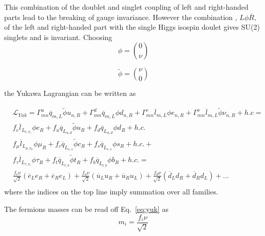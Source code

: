 This combination of the doublet and singlet coupling of left and right-handed parts lead to the breaking of gauge invariance. However the combination , $L\phi\overline{R}$, of the left and right-handed part with the single Higgs isospin doulet gives SU(2) singlets and is invariant. Choosing
\begin{equation}
  \phi = \binom{0}{\nu} %
\end{equation}

\begin{equation}
  \tilde{\phi} = \binom{\nu}{0}
\end{equation}


the Yukawa Lagrangian can be written as %

\begin{equation}
\begin{split}
    &\mathcal{L}_{Yuk} = \Gamma_{mn}^{u}\overline{q}_{m,L}\tilde{\phi}u_{n,R} + \Gamma_{mn}^{d}\overline{q}_{m,L}\phi d_{n,R} + \Gamma_{mn}^{e}\overline{l}_{m,L}\phi e_{n,R} + \Gamma_{mn}^{\nu}\overline{l}_{m,L}\tilde{\phi}\nu_{n,R} +h.c = \\
 &f_{e}\overline{l}_{L_{e,\nu_{e}}}\phi e_{R} + f_{u}\overline{q}_{L_{u,d}}\tilde{\phi}u_{R} + f_{d}\overline{q}_{L_{u,d}}\phi d_{R} + h.c. \\
 & f_{\mu}\overline{l}_{L_{\mu,\nu_{\mu}}}\phi \mu_{R} + f_{c}\overline{q}_{L_{c,s}}\tilde{\phi}c_{R} + f_{s}\overline{q}_{L_{c,s}}\phi s_{R} + h.c. +\\
    & f_{\tau}\overline{l}_{L_{\tau,\nu_{\tau}}}\phi \tau_{R} + f_{t}\overline{q}_{L_{t,b}}\tilde{\phi}t_{R} + f_{b}\overline{q}_{L_{t,b}}\phi b_{R} + h.c. = \\
    & \frac{f_{e}\nu}{\sqrt{2}} (\overline{e}_{L}{e}_{R}+\overline{e}_{R}{e}_{L}) + \frac{f_{u}\nu}{\sqrt{2}}(\overline{u}_{L}{u}_{R}+\overline{u}_{R}{u}_{L}) +\frac{f_{d}\nu}{\sqrt{2}}(\overline{d}_{L}{d}_{R}+\overline{d}_{R}{d}_{L}) +  ...  \\
\end{split}
  \label{eq:yuk}
\end{equation}
where the indices on the top line imply summation over all families.

The fermions masses can be read off Eq.~\ref{eq:yuk} as
\begin{equation}
  m_{i} = \frac{f_{i}\nu}{\sqrt{2}}
\end{equation}

